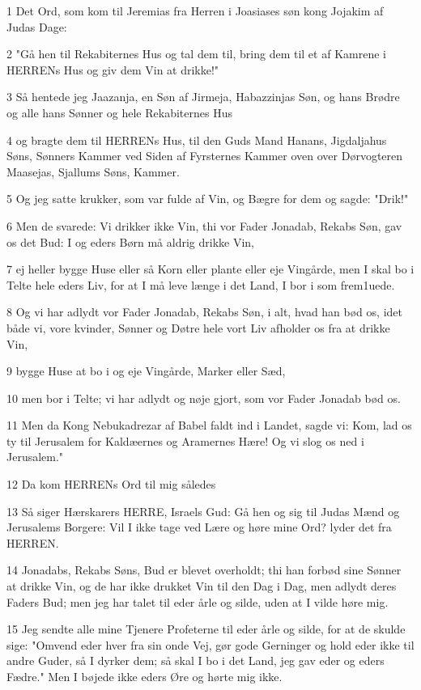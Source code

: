 \par 1 Det Ord, som kom til Jeremias fra Herren i Joasiases søn kong Jojakim af Judas Dage:
\par 2 "Gå hen til Rekabiternes Hus og tal dem til, bring dem til et af Kamrene i HERRENs Hus og giv dem Vin at drikke!"
\par 3 Så hentede jeg Jaazanja, en Søn af Jirmeja, Habazzinjas Søn, og hans Brødre og alle hans Sønner og hele Rekabiternes Hus
\par 4 og bragte dem til HERRENs Hus, til den Guds Mand Hanans, Jigdaljahus Søns, Sønners Kammer ved Siden af Fyrsternes Kammer oven over Dørvogteren Maasejas, Sjallums Søns, Kammer.
\par 5 Og jeg satte krukker, som var fulde af Vin, og Bægre for dem og sagde: "Drik!"
\par 6 Men de svarede: Vi drikker ikke Vin, thi vor Fader Jonadab, Rekabs Søn, gav os det Bud: I og eders Børn må aldrig drikke Vin,
\par 7 ej heller bygge Huse eller så Korn eller plante eller eje Vingårde, men I skal bo i Telte hele eders Liv, for at I må leve længe i det Land, I bor i som frem1uede.
\par 8 Og vi har adlydt vor Fader Jonadab, Rekabs Søn, i alt, hvad han bød os, idet både vi, vore kvinder, Sønner og Døtre hele vort Liv afholder os fra at drikke Vin,
\par 9 bygge Huse at bo i og eje Vingårde, Marker eller Sæd,
\par 10 men bor i Telte; vi har adlydt og nøje gjort, som vor Fader Jonadab bød os.
\par 11 Men da Kong Nebukadrezar af Babel faldt ind i Landet, sagde vi: Kom, lad os ty til Jerusalem for Kaldæernes og Aramernes Hære! Og vi slog os ned i Jerusalem."
\par 12 Da kom HERRENs Ord til mig således
\par 13 Så siger Hærskarers HERRE, Israels Gud: Gå hen og sig til Judas Mænd og Jerusalems Borgere: Vil I ikke tage ved Lære og høre mine Ord? lyder det fra HERREN.
\par 14 Jonadabs, Rekabs Søns, Bud er blevet overholdt; thi han forbød sine Sønner at drikke Vin, og de har ikke drukket Vin til den Dag i Dag, men adlydt deres Faders Bud; men jeg har talet til eder årle og silde, uden at I vilde høre mig.
\par 15 Jeg sendte alle mine Tjenere Profeterne til eder årle og silde, for at de skulde sige: "Omvend eder hver fra sin onde Vej, gør gode Gerninger og hold eder ikke til andre Guder, så I dyrker dem; så skal I bo i det Land, jeg gav eder og eders Fædre." Men I bøjede ikke eders Øre og hørte mig ikke.
